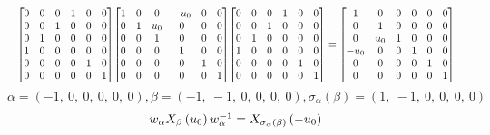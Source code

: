 \documentclass[11pt]{article}
\theoremstyle{definition}
\begin{document}
\[
\scaletoalign{\textwidth}{{\left[\begin{matrix}0 & 0 & 0 & 1 & 0 & 0\\0 & 0 & 1 & 0 & 0 & 0\\0 & 1 & 0 & 0 & 0 & 0\\1 & 0 & 0 & 0 & 0 & 0\\0 & 0 & 0 & 0 & 1 & 0\\0 & 0 & 0 & 0 & 0 & 1\end{matrix}\right]} {\left[\begin{matrix}1 & 0 & 0 & - u_{0} & 0 & 0\\0 & 1 & u_{0} & 0 & 0 & 0\\0 & 0 & 1 & 0 & 0 & 0\\0 & 0 & 0 & 1 & 0 & 0\\0 & 0 & 0 & 0 & 1 & 0\\0 & 0 & 0 & 0 & 0 & 1\end{matrix}\right]} {\left[\begin{matrix}0 & 0 & 0 & 1 & 0 & 0\\0 & 0 & 1 & 0 & 0 & 0\\0 & 1 & 0 & 0 & 0 & 0\\1 & 0 & 0 & 0 & 0 & 0\\0 & 0 & 0 & 0 & 1 & 0\\0 & 0 & 0 & 0 & 0 & 1\end{matrix}\right]} = {\left[\begin{matrix}1 & 0 & 0 & 0 & 0 & 0\\0 & 1 & 0 & 0 & 0 & 0\\0 & u_{0} & 1 & 0 & 0 & 0\\- u_{0} & 0 & 0 & 1 & 0 & 0\\0 & 0 & 0 & 0 & 1 & 0\\0 & 0 & 0 & 0 & 0 & 1\end{matrix}\right]}}
\]
\[
\alpha = \left( -1, \  0, \  0, \  0, \  0, \  0\right), \beta = \left( -1, \  -1, \  0, \  0, \  0, \  0\right), \sigma_{\alpha}(\beta) = \left( 1, \  -1, \  0, \  0, \  0, \  0\right)
\]
\[
\scaletoalign{\textwidth}{w_{\alpha} X_{\beta}\left(u_{0}\right) w_{\alpha}^{-1} = X_{\sigma_{\alpha}\left(\beta\right)}\left(- u_{0}\right)}
\]
\end{document}
